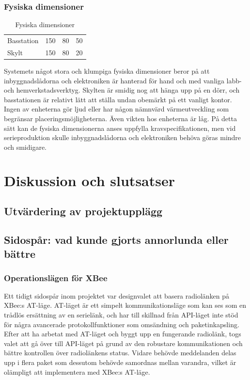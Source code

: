 \documentclass[a4paper,11pt]{article}
\begin{document}
\subsubsection{Fysiska dimensioner}
\begin{table}[h]
\centering
	\begin{tabular}{|l|c|c|c|}
	Basstation & 150 & 80 & 50 \\
	Skylt & 150 & 80 & 20 \\
	\end{tabular}
\caption{Fysiska dimensioner}
\label{tab:dimensiontable}
\end{table}

Systemets något stora och klumpiga fysiska dimensioner beror på att inbyggnadslådorna och elektroniken är hanterad för hand och med vanliga labb- och hemverkstadsverktyg. Skylten är smidig nog att hänga upp på en dörr, och basstationen är relativt lätt att ställa undan obemärkt på ett vanligt kontor. Ingen av enheterna gör ljud eller har någon nämnvärd värmeutveckling som begränsar placeringsmöjligheterna. Även vikten hos enheterna är låg. På detta sätt kan de fysiska dimensionerna anses uppfylla kravspecifikationen, men vid serieproduktion skulle inbyggnadslådorna och elektroniken behöva göras mindre och smidigare.

\section{Diskussion och slutsatser}

\subsection{Utvärdering av projektupplägg}

\subsection{Sidospår: vad kunde gjorts annorlunda eller bättre}

\subsubsection{Operationslägen för XBee}
Ett tidigt sidospår inom projektet var designvalet att basera radiolänken på XBee:s AT-läge. AT-läget är ett simpelt kommunikationsläge som kan ses som en trådlös ersättning av en serielänk, och har till skillnad från API-läget inte stöd för några avancerade protokollfunktioner som omsändning och paketinkapsling. Efter att ha arbetat med AT-läget och byggt upp en fungerande radiolänk, togs valet att gå över till API-läget på grund av den robustare kommunikationen och bättre kontrollen över radiolänkens status. Vidare behövde meddelanden delas upp i flera paket som dessutom behövde samordnas mellan varandra, vilket är olämpligt att implementera med XBee:s AT-läge.
\end{document}
